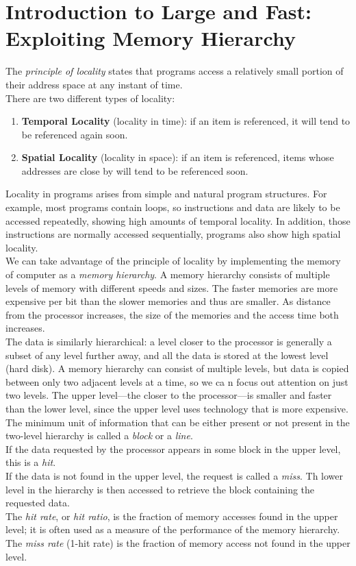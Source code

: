 \documentclass[12pt]{article}
\theoremstyle{definition}
\begin{document}
  \section{Introduction to Large and Fast: Exploiting Memory Hierarchy}
  The \emph{principle of locality} states that programs access a relatively small portion of their address space at any instant of time. \\
  There are two different types of locality:
  \begin{enumerate}
    \item \textbf{Temporal Locality} (locality in time): if an item is referenced, it will tend to be referenced again soon.
    \item \textbf{Spatial Locality} (locality in space): if an item is referenced, items whose addresses are close by will tend to be referenced soon.
  \end{enumerate}
  Locality in programs arises from simple and natural program structures.
  For example, most programs contain loops, so instructions and data are likely to be accessed repeatedly, showing high amounts of temporal locality.
  In addition, those instructions are normally accessed sequentially, programs also show high spatial locality. \\

  We can take advantage of the principle of locality by implementing the memory of computer as a \emph{memory hierarchy}.
  A memory hierarchy consists of multiple levels of memory with different speeds and sizes.
  The faster memories are more expensive per bit than the slower memories and thus are smaller.
  As distance from the processor increases, the size of the memories and the access time both increases. \\

  The data is similarly hierarchical: a level closer to the processor is generally a subset of any level further away, and all the data is stored at the lowest level (hard disk).
  A memory hierarchy can consist of multiple levels, but data is copied between only two adjacent levels at a time, so we ca n focus out attention on just two levels.
  The upper level---the closer to the processor---is smaller and faster than the lower level, since the upper level uses technology that is more expensive.
  The minimum unit of information that can be either present or not present in the two-level hierarchy is called a \emph{block} or a \emph{line}. \\

  If the data requested by the processor appears in some block in the upper level, this is a \emph{hit}. \\
  If the data is not found in the upper level, the request is called a \emph{miss}.
  Th lower level in the hierarchy is then accessed to retrieve the block containing the requested data. \\
  The \emph{hit rate}, or \emph{hit ratio}, is the fraction of memory accesses found in the upper level; it is often used as a measure of the performance of the memory hierarchy. \\
  The \emph{miss rate} (1-hit rate) is the fraction of memory access not found in the upper level. \\
\end{document}

